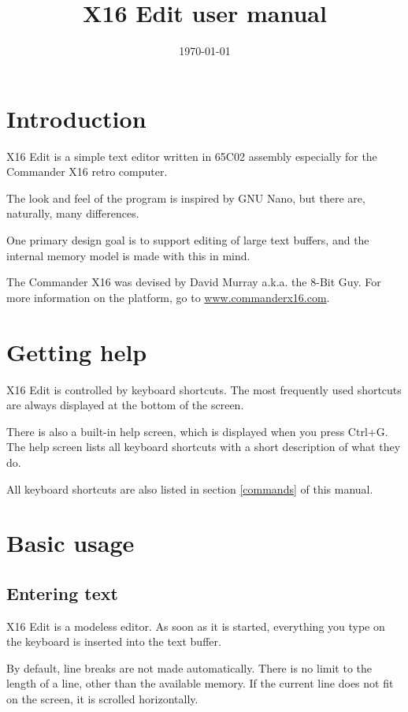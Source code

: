 \documentclass{article}
\title{X16 Edit user manual}
\date{\today}
\begin{document}
\maketitle

\section{Introduction}

    X16 Edit is a simple text editor written in 65C02 assembly especially
    for the Commander X16 retro computer. 
    
    The look and feel of the program is inspired by GNU Nano, but there are,
    naturally, many differences.
    
    One primary design goal is to support editing of large text 
    buffers, and the internal memory model is made with this in mind.

    The Commander X16 was devised by David Murray a.k.a. the 
    8-Bit Guy. For more information on the platform, go to 
    \href{http://www.commanderx16.com}{www.commanderx16.com}.

\section{Getting help}

    X16 Edit is controlled by keyboard shortcuts. The most frequently used 
    shortcuts are always displayed at the bottom of the screen.
    
    There is also a built-in help screen, which is displayed when you press
    Ctrl+G. The help screen lists all keyboard shortcuts with a short description
    of what they do.

    All keyboard shortcuts are also listed in section \ref{commands} of this manual.

\section{Basic usage}

    \subsection{Entering text}
           
        X16 Edit is a modeless editor. As soon as it is started, everything you
        type on the keyboard is inserted into the text buffer.
        
        By default, line breaks are not made automatically. There is no limit
        to the length of a line, other than the available memory. If 
        the current line does not fit on the screen, it is 
        scrolled horizontally. 
        
\end{document}
